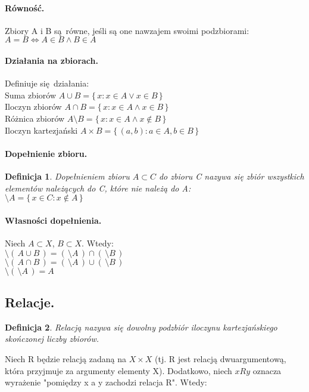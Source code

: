\documentclass{article}
\newtheorem{definition}{Definicja}[section]
\begin{document}
    \paragraph{Równość.} Zbiory A i B są równe, jeśli są one nawzajem swoimi podzbiorami:\\
    $A = B \Leftrightarrow A \in B \wedge B \in A$
    \paragraph{Działania na zbiorach.} Definiuje się działania:\\
    Suma zbiorów $A \cup B = \{\,x: x \in A \vee x \in B\,\}$\\
    Iloczyn zbiorów $A \cap B = \{\,x: x \in A \wedge x \in B\,\}$\\
    Różnica zbiorów $A \setminus B = \{\,x: x \in A \wedge x \notin B\,\}$\\
    Iloczyn kartezjański $A \times B = \{\,(a,b): a \in A, b \in B\,\}$
    \paragraph{Dopełnienie zbioru.}
    \begin{definition}
        Dopełnieniem zbioru $A \subset C$ do zbioru C nazywa się zbiór wszystkich elementów należących do C, które nie należą do A:\\
        $\setminus A = \{\,x \in C: x \notin A\,\}$
    \end{definition}
    \paragraph{Własności dopełnienia.}
    Niech $A \subset X$, $B \subset X$. Wtedy:\\
    $\setminus(\,A \cup B\,) = (\,\setminus A\,) \cap (\,\setminus B\,)$\\
    $\setminus(\,A \cap B\,) = (\,\setminus A\,) \cup (\,\setminus B\,)$\\
    $\setminus(\,\setminus A\,) = A$
    \subsection{Relacje.}
    \begin{definition}
        Relacją nazywa się dowolny podzbiór iloczynu kartezjańskiego skończonej liczby zbiorów.
    \end{definition}
    
    Niech R będzie relacją zadaną na $X \times X$ (tj. R jest relacją dwuargumentową, która przyjmuje za argumenty elementy X). Dodatkowo, niech $xRy$ oznacza wyrażenie "pomiędzy x a y zachodzi relacja R". Wtedy:
\end{document}

